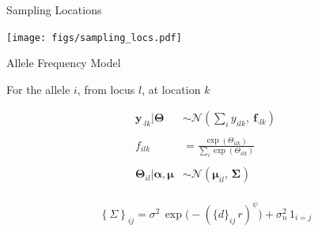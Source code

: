 \documentclass[11pt,ignorenonframetext,]{beamer}
\begin{document}
\begin{frame}{Sampling Locations}
\protect\hypertarget{sampling-locations}{}

\begin{center}
\texttt{[image: figs/sampling\_locs.pdf]}
\end{center}

\end{frame}

\begin{frame}{Allele Frequency Model}
\protect\hypertarget{allele-frequency-model}{}

For the allele \(i\), from locus \(l\), at location \(k\)

\[
\begin{aligned}
\symbf{y}_{\cdot l k}|\symbf{\Theta} &\sim \mathcal{N}\left(\textstyle\sum_i y_{ilk},\: \symbf{f}_{\cdot l k}\right) \\
\\
f_{ilk} &= \frac{\exp(\Theta_{ilk})}{\sum_i \exp(\Theta_{ilk})} \\
\\
\symbf{\Theta}_{il}|\symbf{\alpha},\symbf{\mu} &\sim \mathcal{N}( \symbf{\mu}_{il},\, \symbf{\Sigma_{}}) \\
\end{aligned}
\]

\[ \left\{\Sigma\right\}_{ij} = \sigma^2 \, \exp \Big(-(\{d\}_{ij}\, r)^{\psi} \Big) + \sigma^2_n \, {1}_{i=j} \]

\end{frame}
\end{document}
